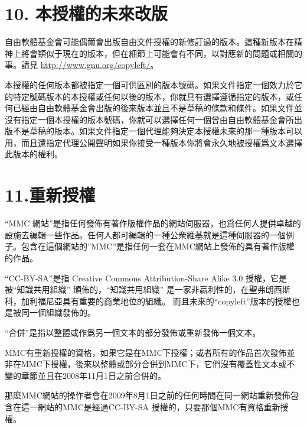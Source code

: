 \section{10. 本授權的未來改版}
自由軟體基金會可能偶爾會出版自由文件授權的新修訂過的版本。這種新版本在精神上將會類似于現在的版本，但在細節上可能會有不同，以對應新的問題或相關的事。請見 \url{http://www.gnu.org/copyleft/}。\par
本授權的任何版本都被指定一個可供區別的版本號碼。如果文件指定一個效力於它的特定號碼版本的本授權或任何以後的版本，你就具有選擇遵循指定的版本，或任何已經由自由軟體基金會出版的後來版本並且不是草稿的條款和條件。如果文件並沒有指定一個本授權的版本號碼，你就可以選擇任何一個曾由自由軟體基金會所出版不是草稿的版本。如果文件指定一個代理能夠決定本授權未來的那一種版本可以用，而且還指定代理公開聲明如果你接受一種版本你將會永久地被授權爲文本選擇此版本的權利。
\section{11.重新授權}
“MMC 網站”是指任何發佈有著作版權作品的網站伺服器，也爲任何人提供卓越的設施去編輯一些作品。任何人都可編輯的一種公衆維基就是這種伺服器的一個例子。包含在這個網站的”MMC”是指任何一套在MMC網站上發佈的具有著作版權的作品。\par
“CC-BY-SA”是指 Creative Commons Attribution-Share Alike 3.0 授權，它是被“知識共用組織” 頒佈的，“知識共用組織” 是一家非贏利性的，在聖弗朗西斯科，加利福尼亞具有重要的商業地位的組織。 而且未來的“copyleft”版本的授權也是被同一個組織發佈的。\par
“合併”是指以整體或作爲另一個文本的部分發佈或重新發佈一個文本。\par
MMC有重新授權的資格，如果它是在MMC下授權；或者所有的作品首次發佈並非在MMC下授權，後來以整體或部分合併到MMC下，它們沒有覆蓋性文本或不變的章節並且在2008年11月1日之前合併的。\par
那麽MMC網站的操作者會在2009年8月1日之前的任何時間在同一網站重新發佈包含在這一網站的MMC是經過CC-BY-SA 授權的，只要那個MMC有資格重新授權。
